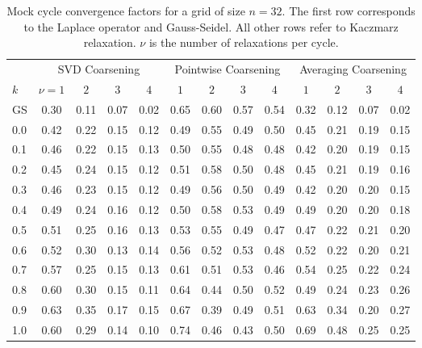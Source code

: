 \documentclass{article}
\begin{document}
\begin{table}
{\small
\begin{tabular}{l|cccc|cccc|cccc}
\toprule
& \multicolumn{4}{c|}{SVD Coarsening} & \multicolumn{4}{|c|}{Pointwise Coarsening} & \multicolumn{4}{|c}{Averaging Coarsening} \\
$k$ &  $\nu=1$ &  $2$ &  $3$ &  $4$ &  $1$ &  $2$ &  $3$ &  $4$ &  $1$ &  $2$ &  $3$ &  $4$ \\
\midrule
GS &       0.30 &       0.11 &       0.07 &       0.02 &      0.65 &      0.60 &      0.57 &      0.54 &       0.32 &       0.12 &       0.07 &       0.02 \\
0.0   &       0.42 &       0.22 &       0.15 &       0.12 &      0.49 &      0.55 &      0.49 &      0.50 &       0.45 &       0.21 &       0.19 &       0.15 \\
0.1   &       0.46 &       0.22 &       0.15 &       0.13 &      0.50 &      0.55 &      0.48 &      0.48 &       0.42 &       0.20 &       0.19 &       0.15 \\
0.2   &       0.45 &       0.24 &       0.15 &       0.12 &      0.51 &      0.58 &      0.50 &      0.48 &       0.45 &       0.21 &       0.19 &       0.16 \\
0.3   &       0.46 &       0.23 &       0.15 &       0.12 &      0.49 &      0.56 &      0.50 &      0.49 &       0.42 &       0.20 &       0.20 &       0.15 \\
0.4   &       0.49 &       0.24 &       0.16 &       0.12 &      0.50 &      0.58 &      0.53 &      0.49 &       0.49 &       0.20 &       0.20 &       0.18 \\
0.5   &       0.51 &       0.25 &       0.16 &       0.13 &      0.53 &      0.55 &      0.49 &      0.47 &       0.47 &       0.22 &       0.21 &       0.20 \\
0.6   &       0.52 &       0.30 &       0.13 &       0.14 &      0.56 &      0.52 &      0.53 &      0.48 &       0.52 &       0.22 &       0.20 &       0.21 \\
0.7   &       0.57 &       0.25 &       0.15 &       0.13 &      0.61 &      0.51 &      0.53 &      0.46 &       0.54 &       0.25 &       0.22 &       0.24 \\
0.8   &       0.60 &       0.30 &       0.15 &       0.11 &      0.64 &      0.44 &      0.50 &      0.52 &       0.49 &       0.24 &       0.23 &       0.26 \\
0.9   &       0.63 &       0.35 &       0.17 &       0.15 &      0.67 &      0.39 &      0.49 &      0.51 &       0.63 &       0.34 &       0.20 &       0.27 \\
1.0   &       0.60 &       0.29 &       0.14 &       0.10 &      0.74 &      0.46 &      0.43 &      0.50 &       0.69 &       0.48 &       0.25 &       0.25 \\
\bottomrule
\end{tabular}
}
\caption{Mock cycle convergence factors for a grid of size $n=32$. The first row corresponds to the Laplace operator and Gauss-Seidel. All other rows refer to Kaczmarz relaxation. $\nu$ is the number of relaxations per cycle.}
\end{table}
\end{document}
